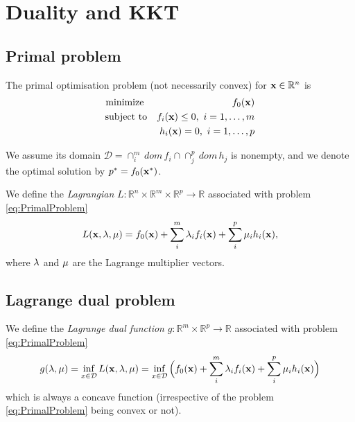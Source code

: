 
\clearpage

\section{Duality and KKT}\label{sec:Duality}

\subsection{Primal problem}\label{sec:Primal}

The primal optimisation problem (not necessarily convex) for $\mathbf{x} \in \mathbb{R}^n$ is
\begin{eqnarray}\label{eq:PrimalProblem}
  \text{minimize }  & & f_0(\mathbf{x}) \nonumber \\
  \text{subject to} & & f_i(\mathbf{x}) \leq 0, ~ i=1,\ldots,m \\
		    & & h_i(\mathbf{x}) =0, ~ i=1,\ldots,p \nonumber
\end{eqnarray}

We assume its domain $\mathcal{D} = \cap_i^m \, dom  \, f_i \cap \cap_j^p \, dom \, h_j$ is nonempty, and we denote the optimal solution by $p^* = f_0(\mathbf{x}^*)$.

We define the \emph{Lagrangian} $L: \mathbb{R}^n \times \mathbb{R}^m \times \mathbb{R}^p \rightarrow \mathbb{R}$ associated with problem \eqref{eq:PrimalProblem}
\begin{equation}\label{eq:Lagrangian}
 L(\mathbf{x},\mathbf{\lambda},\mathbf{\mu}) = f_0(\mathbf{x}) 
+ \sum_i^m \lambda_i f_i(\mathbf{x})
+ \sum_i^p \mu_i h_i(\mathbf{x}),
\end{equation}
where $\mathbf{\lambda}$ and $\mathbf{\mu}$ are the Lagrange multiplier vectors.


\subsection{Lagrange dual problem}\label{sec:Dual}
We define the \emph{Lagrange dual function} $g: \mathbb{R}^m \times \mathbb{R}^p \rightarrow \mathbb{R}$ associated with problem \eqref{eq:PrimalProblem}
\begin{equation}\label{eq:LagrangeDual}
 g(\mathbf{\lambda},\mathbf{\mu}) 
= \inf_{x \in \mathcal{D}} L(\mathbf{x},\mathbf{\lambda},\mathbf{\mu})
= \inf_{x \in \mathcal{D}} \Big(
f_0(\mathbf{x}) 
+ \sum_i^m \lambda_i f_i(\mathbf{x})
+ \sum_i^p \mu_i h_i(\mathbf{x}) \Big)
\end{equation}
which is always a concave function (irrespective of the problem \eqref{eq:PrimalProblem} being convex or not).

